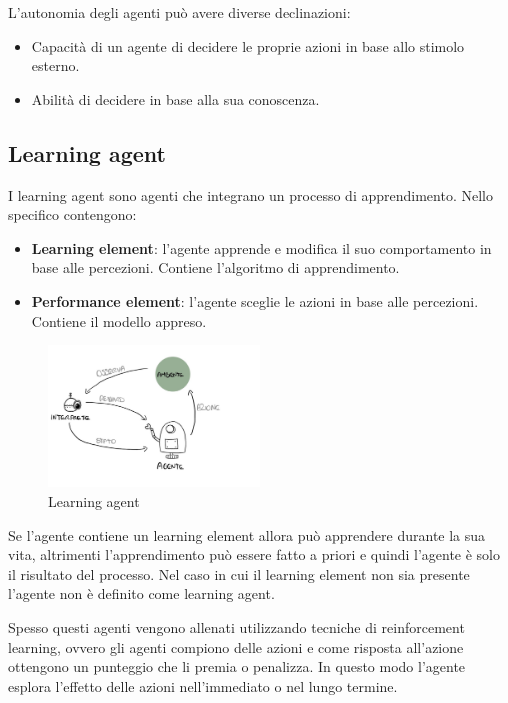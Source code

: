 L'autonomia degli agenti può avere diverse declinazioni:
\begin{itemize}
    \item Capacità di un agente di decidere le proprie azioni in base allo stimolo
          esterno.
    \item Abilità di decidere in base alla sua conoscenza.
\end{itemize}
\subsection{Learning agent}
I learning agent sono agenti che integrano un processo di apprendimento. Nello
specifico contengono:
\begin{itemize}
    \item \textbf{Learning element}: l'agente apprende e modifica il suo comportamento
          in base alle percezioni. Contiene l'algoritmo di apprendimento.
    \item \textbf{Performance element}: l'agente sceglie le azioni in base alle
          percezioni. Contiene il modello appreso.
\end{itemize}
\begin{figure}[!ht]
    \centering
    \includegraphics[width=0.50\textwidth]{./img/Agenti/learning_agent.jpg}
    \caption{Learning agent}
    \label{fig:Learning_agent}
\end{figure}

Se l'agente contiene un learning element allora può apprendere durante la sua vita,
altrimenti l'apprendimento può essere fatto a priori e quindi l'agente è solo il
risultato del processo. Nel caso in cui il learning element non sia presente
l'agente non è definito come learning agent.

Spesso questi agenti vengono allenati utilizzando tecniche di reinforcement
learning, ovvero gli agenti compiono delle azioni e come risposta all'azione
ottengono un punteggio che li premia o penalizza. In questo modo l'agente esplora
l'effetto delle azioni nell'immediato o nel lungo termine.
